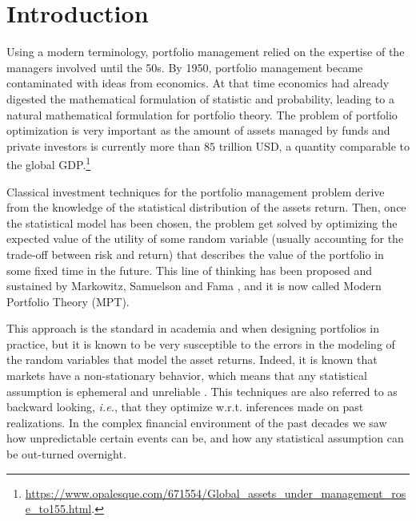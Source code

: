 \chapter{Introduction}

Using a modern terminology, portfolio management relied on the expertise of the managers involved until the 50s. By 1950, portfolio management became contaminated with ideas from economics. At that time economics had already digested the mathematical formulation of statistic and probability, leading to a natural mathematical formulation for portfolio theory.
The problem of portfolio optimization is very important as the amount of assets managed by funds and private investors is currently more than $85$ trillion USD, a quantity comparable to the global GDP.\footnote{\url{https://www.opalesque.com/671554/Global_assets_under_management_rose_to155.html}.}

Classical investment techniques for the portfolio management problem derive from the knowledge of the statistical distribution of the assets return. Then, once the statistical model has been chosen, the problem get solved by optimizing the expected value of the utility of some random variable (usually accounting for the trade-off between risk and return) that describes the value of the portfolio in some fixed time in the future. This line of thinking has been proposed and sustained by Markowitz, Samuelson and Fama \cite{markowitz1952portfolio}, and it is now called Modern Portfolio Theory (MPT). 

This approach is the standard in academia and when designing portfolios in practice, but it is known to be very susceptible to the errors in the modeling of the random variables that model the asset returns. 
Indeed, it is known that markets have a non-stationary behavior, which means that any statistical assumption is ephemeral and unreliable \cite{schmitt2013non}. This techniques are also referred to as backward looking, \emph{i.e.}, that they optimize w.r.t. inferences made on past realizations. In the complex financial environment of the past decades we saw how unpredictable certain events can be, and how any statistical assumption can be out-turned overnight.

